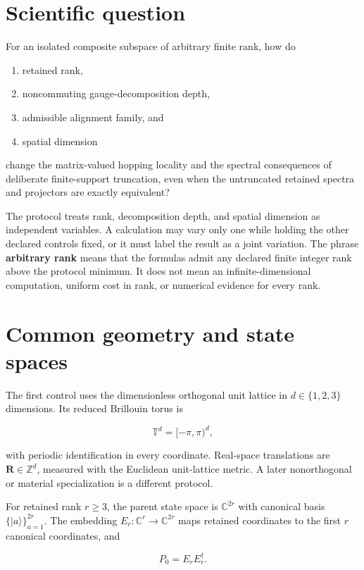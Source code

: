 \documentclass[11pt]{article}
\begin{document}
\section{Scientific question}

For an isolated composite subspace of arbitrary finite rank, how do

\begin{enumerate}
\item retained rank,
\item noncommuting gauge-decomposition depth,
\item admissible alignment family, and
\item spatial dimension
\end{enumerate}

change the matrix-valued hopping locality and the spectral consequences of deliberate
finite-support truncation, even when the untruncated retained spectra and projectors are
exactly equivalent?

The protocol treats rank, decomposition depth, and spatial dimension as independent
variables. A calculation may vary only one while holding the other declared controls
fixed, or it must label the result as a joint variation. The phrase \textbf{arbitrary rank}
means that the formulas admit any declared finite integer rank above the protocol
minimum. It does not mean an infinite-dimensional computation,
uniform cost in rank, or numerical evidence for every rank.

\section{Common geometry and state spaces}

The first control uses the dimensionless orthogonal unit lattice in
$d\in\{1,2,3\}$ dimensions. Its reduced Brillouin torus is

\[
\mathbb T^d=[-\pi,\pi)^d,
\]

with periodic identification in every coordinate. Real-space translations are
$\mathbf R\in\mathbb Z^d$, measured with the Euclidean unit-lattice metric. A later
nonorthogonal or material specialization is a different protocol.

For retained rank $r\geq3$, the parent state space is $\mathbb C^{2r}$ with canonical
basis $\{|a\rangle\}_{a=1}^{2r}$. The embedding
$E_r:\mathbb C^r\rightarrow\mathbb C^{2r}$ maps retained coordinates to the first $r$
canonical coordinates, and

\[
P_0=E_rE_r^\dagger.
\]
\end{document}
